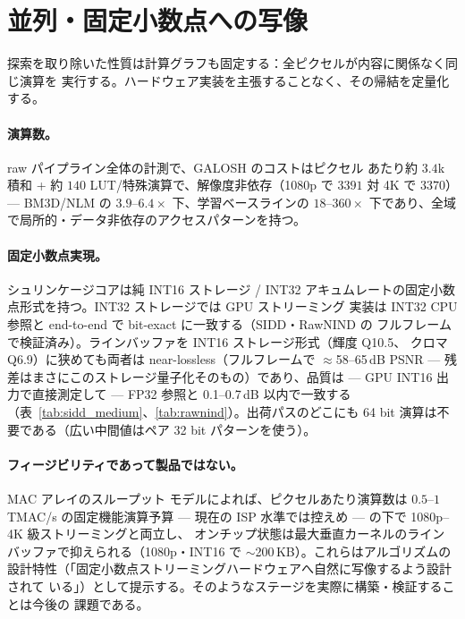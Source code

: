 \documentclass[10pt,twocolumn]{article}
\begin{document}
\section{並列・固定小数点への写像}\label{sec:map}
探索を取り除いた性質は計算グラフも固定する：全ピクセルが内容に関係なく同じ演算を
実行する。ハードウェア実装を主張することなく、その帰結を定量化する。

\paragraph{演算数。} raw パイプライン全体の計測で、GALOSH のコストはピクセル
あたり約 $3.4$k 積和 + 約 $140$ LUT/特殊演算で、解像度非依存（1080p で $3391$
対 4K で $3370$）--- BM3D/NLM の $3.9$--$6.4\times$ 下、学習ベースラインの
$18$--$360\times$ 下であり、全域で局所的・データ非依存のアクセスパターンを持つ。

\paragraph{固定小数点実現。} シュリンケージコアは純 INT16 ストレージ / INT32
アキュムレートの固定小数点形式を持つ。INT32 ストレージでは GPU ストリーミング
実装は INT32 CPU 参照と end-to-end で bit-exact に一致する（SIDD・RawNIND の
フルフレームで検証済み）。ラインバッファを INT16 ストレージ形式（輝度 Q10.5、
クロマ Q6.9）に狭めても両者は near-lossless（フルフレームで $\approx$58--65\,dB
PSNR --- 残差はまさにこのストレージ量子化そのもの）であり、品質は ---
GPU INT16 出力で直接測定して --- FP32 参照と 0.1--0.7\,dB 以内で一致する
（表~\ref{tab:sidd_medium}、\ref{tab:rawnind}）。出荷パスのどこにも
64 bit 演算は不要である（広い中間値はペア 32 bit パターンを使う）。

\paragraph{フィージビリティであって製品ではない。} MAC アレイのスループット
モデルによれば、ピクセルあたり演算数は $0.5$--$1$\,TMAC/s の固定機能演算予算
--- 現在の ISP 水準では控えめ --- の下で 1080p--4K 級ストリーミングと両立し、
オンチップ状態は最大垂直カーネルのライン
バッファで抑えられる（1080p・INT16 で $\sim$200\,KB）。これらはアルゴリズムの
設計特性（「固定小数点ストリーミングハードウェアへ自然に写像するよう設計されて
いる」）として提示する。そのようなステージを実際に構築・検証することは今後の
課題である。

\end{document}
